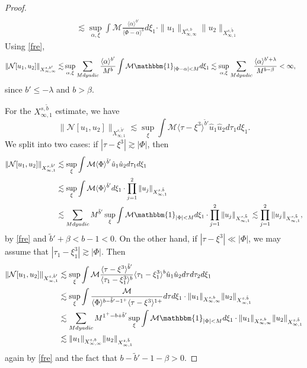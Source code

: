 \documentclass[%
11pt,  reqno]{amsart}
\newcommand{\jap}[1]{\langle #1 \rangle}
\newcommand{\5}{\textup{V}}
\theoremstyle{remark}
\numberwithin{equation}{section}
\numberwithin{theorem}{section}
\newcommand{\Ncal}{\mathcal{N}}
\begin{document}
{\begin{proof}
\begin{align}
                \\& \lesssim \sup_{\alpha,\xi} \int \mathcal{M}\frac{\jap{\alpha}^{b'}}{\jap{\Phi-\alpha}^b  } d\xi_1 \cdot  \|u_1\|_{X^{s,b}_{\infty,\infty}}\|u_2\|_{X^{s,\tilde{b}}_{\infty,1}}
			\end{align}
Using \eqref{fre},
			\begin{align}
				\|\Ncal[u_1,u_2] \|_{X^{s,b'}_{\infty, \infty}}\lesssim &\sup_{\alpha,\xi}\sum_{M dyadic} \frac{\jap{\alpha}^{b'}}{M^{b}}\int \mathcal{M}\mathbbm{1}_{|\Phi-\alpha|<M} d\xi_1 \lesssim \sup_{\alpha,\xi}\sum_{M dyadic} \frac{\jap{\alpha}^{b'+\lambda}}{M^{b-\beta}} <\infty,
			\end{align}
			since $b'\le -\lambda$ and $b>\beta$.
            
            For the $X^{s,\tilde{b}}_{\infty, 1}$ estimate, we have
			\begin{equation}
				\|\Ncal[u_1,u_2]\|_{X^{s,\tilde{b}'}_{\infty,1}} \lesssim \sup_\xi \int \mathcal{M} \jap{\tau-\xi^3}^{\tilde{b}'}  \hat{u}_1 \hat{u}_2 d\tau_1 d\xi_1.
			\end{equation}
			We split into two cases: if $|\tau-\xi^3|\gtrsim |\Phi|$, then
			\begin{align}
				\|\Ncal[u_1,u_2]\|_{X^{s,\tilde{b}'}_{\infty,1}} &\lesssim \sup_\xi \int \mathcal{M} \jap{\Phi}^{\tilde{b}'} \hat{u}_1\hat{u}_2 d\tau_1 d\xi_1 \\&\lesssim \sup_\xi \int \mathcal{M} \jap{\Phi}^{\tilde{b}'} d\xi_1 \cdot  \prod_{j=1}^2\|u_j\|_{X^{s,\tilde{b}}_{\infty,1}} \\&\lesssim \sum_{M dyadic} M^{\tilde{b}'} \sup_\xi \int \mathcal{M} \mathbbm{1}_{|\Phi|<M} d\xi_1 \cdot \prod_{j=1}^2\|u_j\|_{X^{s,\tilde{b}}_{\infty,1}}  \lesssim \prod_{j=1}^2\|u_j\|_{X^{s,\tilde{b}}_{\infty,1}} ,
			\end{align}
			by \eqref{fre} and $\tilde{b}'+\beta<b-1<0$. On the other hand, if $|\tau-\xi^3|\ll |\Phi|$, we may assume that $|\tau_1-\xi_1^3|\gtrsim |\Phi|$. Then
			\begin{align}
				\|\Ncal[u_1,u_2]\|_{X^{s,\tilde{b}'}_{\infty,1}} &\lesssim \sup_\xi \int \mathcal{M} \frac{\jap{\tau-\xi^3}^{\tilde{b}'}}{\jap{\tau_1-\xi_1^3}^b} \jap{\tau_1-\xi_1^3}^b\hat{u}_1  \hat{u}_2 d\tau d\tau_2 d\xi_1 \\&\lesssim \sup_\xi \int \frac{\mathcal{M}}{\jap{\Phi}^{b-\tilde{b}'-1^+}\jap{\tau-\xi^3}^{1+} } d\tau d\xi_1 \cdot \|u_1\|_{X^{s,b}_{\infty,\infty}} \|u_2\|_{X^{s,\tilde{b}}_{\infty,1}} \\&\lesssim \sum_{M dyadic} M^{1^+-b+\tilde{b}'} \sup_\xi \int \mathcal{M} \mathbbm{1}_{|\Phi|<M} d\xi_1\cdot \|u_1\|_{X^{s,b}_{\infty,\infty}}  \|u_2\|_{X^{s,\tilde{b}}_{\infty,1}}\\& \lesssim\|u_1\|_{X^{s,b}_{\infty,\infty}}  \|u_2\|_{X^{s,\tilde{b}}_{\infty,1}}
			\end{align}
			again by \eqref{fre} and the fact that $b-\tilde{b}'-1-\beta>0$.
		\end{proof}
		
}
\end{document}
